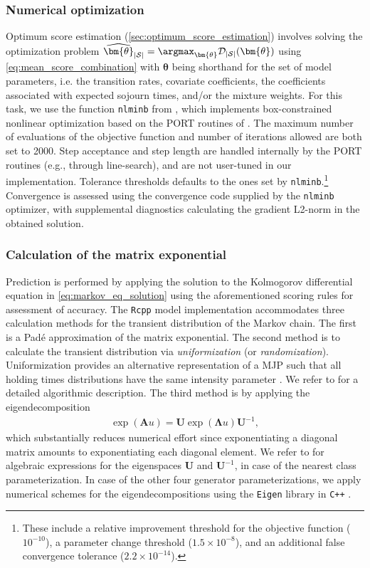 \subsubsection{Numerical optimization} 
Optimum score estimation (\cref{sec:optimum_score_estimation}) involves solving the optimization problem $\widehat{\bm{\theta}}_{|\mathcal{S}|} = \argmax_{\bm{\theta}}\mathcal{D}_{|\mathcal{S}|}(\bm{\theta})$ using \cref{eq:mean_score_combination} with $\bm{\theta}$ being shorthand for the set of model parameters, i.e. the transition rates, covariate coefficients, the coefficients associated with expected sojourn times, and/or the mixture weights.
For this task, we use the function \texttt{nlminb} from \citet{R_stats}, which implements box-constrained nonlinear optimization based on the PORT routines of \citet{Gay1990}. The maximum number of evaluations of the objective function and number of iterations allowed are both set to 2000.
Step acceptance and step length are handled internally by the PORT routines (e.g., through line-search), and are not user-tuned in our implementation.
Tolerance thresholds defaults to the ones set by \texttt{nlminb}.\footnote{These include a relative improvement threshold for the objective function ($10^{-10}$), a parameter change threshold ($1.5 \times 10^{-8}$), and an additional false convergence tolerance ($2.2\times 10^{-14}$).}
Convergence is assessed using the convergence code supplied by the \texttt{nlminb} optimizer, with supplemental diagnostics calculating the gradient L2-norm in the obtained solution.




\subsubsection{Calculation of the matrix exponential} Prediction is performed by applying the solution to the Kolmogorov differential equation in \cref{eq:markov_eq_solution} using the aforementioned scoring rules for assessment of accuracy.
The \texttt{Rcpp} model implementation accommodates three calculation methods for the transient distribution of the Markov chain. The first is a Padé approximation of the matrix exponential. The second method is to calculate the transient distribution via \textit{uniformization} (or \textit{randomization}). Uniformization provides an alternative representation of a MJP such that all holding times distributions have the same intensity parameter \citep[Section 1.3.4]{bladt_nielsen}. We refer to \citet{sherlock2021a} for a detailed algorithmic description. The third method is by applying the eigendecomposition
\begin{align*}
    \exp{\left( \bm{A}u \right) } = \bm{U}  \exp{\left( \bm{\Lambda}u \right) } \bm{U}^{-1}, 
\end{align*}
which substantially reduces numerical effort since exponentiating a diagonal matrix amounts to exponentiating each diagonal element.
We refer to \citet{bisgaard2024A} for algebraic expressions for the eigenspaces $\bm{U}$ and $\bm{U}^{-1}$, in case of the nearest class parameterization. In case of the other four generator parameterizations, we apply numerical schemes for the eigendecompositions using the \texttt{Eigen} library in \texttt{C++} \citep{eigenweb}.

